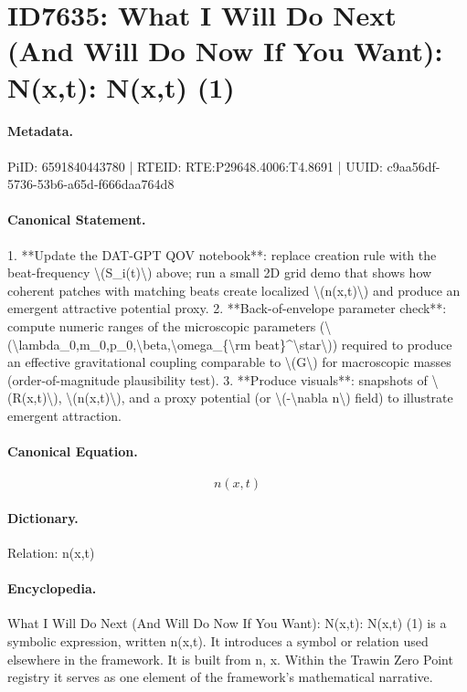 \section*{ID7635: What I Will Do Next (And Will Do Now If You Want): N(x,t): N(x,t) (1)}
\paragraph{Metadata.}
PiID: 6591840443780 | RTEID: RTE:P29648.4006:T4.8691 | UUID: c9aa56df-5736-53b6-a65d-f666daa764d8

\paragraph{Canonical Statement.}
1. **Update the DAT-GPT QOV notebook**: replace creation rule with the beat-frequency \textbackslash{}(S\_i(t)\textbackslash{}) above; run a small 2D grid demo that shows how coherent patches with matching beats create localized \textbackslash{}(n(x,t)\textbackslash{}) and produce an emergent attractive potential proxy. 2. **Back-of-envelope parameter check**: compute numeric ranges of the microscopic parameters (\textbackslash{}(\textbackslash{}lambda\_0,m\_0,p\_0,\textbackslash{}beta,\textbackslash{}omega\_\{\textbackslash{}rm beat\}\textasciicircum{}\textbackslash{}star\textbackslash{})) required to produce an effective gravitational coupling comparable to \textbackslash{}(G\textbackslash{}) for macroscopic masses (order-of-magnitude plausibility test). 3. **Produce visuals**: snapshots of \textbackslash{}(R(x,t)\textbackslash{}), \textbackslash{}(n(x,t)\textbackslash{}), and a proxy potential (or \textbackslash{}(-\textbackslash{}nabla n\textbackslash{}) field) to illustrate emergent attraction.

\paragraph{Canonical Equation.}
\[
n(x,t)
\]

\paragraph{Dictionary.}
Relation: n(x,t)

\paragraph{Encyclopedia.}
What I Will Do Next (And Will Do Now If You Want): N(x,t): N(x,t) (1) is a symbolic expression, written n(x,t). It introduces a symbol or relation used elsewhere in the framework. It is built from n, x. Within the Trawin Zero Point registry it serves as one element of the framework's mathematical narrative.
